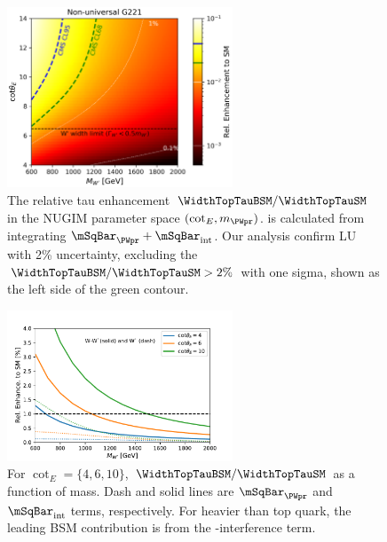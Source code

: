 \begin{figure}
    \centering
    \includegraphics[width=0.6\textwidth]{chapters/Physics/sectionBSM/figures/RelEnhance.png} 
    \caption{The relative tau enhancement $ \WidthTopTauBSM/  \WidthTopTauSM $ in the NUGIM parameter space $(\cot_E, m_{\PWpr})$. \WidthTopTauBSM is calculated from integrating $\mSqBar _{\PWpr} +  \mSqBar _{\mathrm{int}}$.  Our analysis confirm LU with 2\% uncertainty, excluding the $ \WidthTopTauBSM/  \WidthTopTauSM > 2\% $ with one sigma, shown as the left side of the green contour.}
    \label{fig:physics:bsm:WPrime:tauEnhancement}
\end{figure}


\begin{figure}
    \centering
    \includegraphics[width=0.6\textwidth]{chapters/Physics/sectionBSM/figures/RelEnhance1D.pdf} 
    \caption{For $\cot_E=\{4,6,10\}$, $\WidthTopTauBSM/  \WidthTopTauSM $ as a function of \PWpr mass. Dash and solid lines are $\mSqBar _{\PWpr} $ and $\mSqBar _{\mathrm{int}}$  terms, respectively. For \PWpr heavier than top quark, the leading BSM contribution is from the \PW-\PWpr interference term. }
    \label{fig:physics:bsm:WPrime:tauEnhancement1d}
\end{figure}



